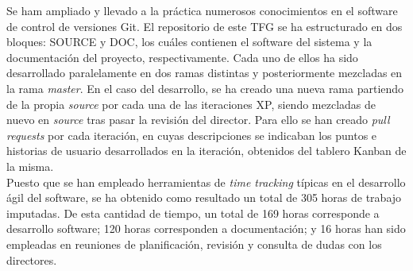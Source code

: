 Se ham ampliado y llevado a la práctica numerosos conocimientos en el software de control de versiones Git. El repositorio de este \gls{TFG} se ha estructurado en dos bloques: SOURCE y DOC, los cuáles contienen el software del sistema y la documentación del proyecto, respectivamente. Cada uno de ellos ha sido desarrollado paralelamente en dos ramas distintas y posteriormente mezcladas en la rama \textit{master}. En el caso del desarrollo, se ha creado una nueva rama partiendo de la propia \textit{source} por cada una de las iteraciones \gls{XP}, siendo mezcladas de nuevo en \textit{source} tras pasar la revisión del director. Para ello se han creado \textit{pull requests} por cada iteración, en cuyas descripciones se indicaban los puntos e historias de usuario desarrollados en la iteración, obtenidos del tablero Kanban de la misma.\\

Puesto que se han empleado herramientas de \textit{time tracking} típicas en el desarrollo ágil del software, se ha obtenido como resultado un total de 305 horas de trabajo imputadas. De esta cantidad de tiempo, un total de 169 horas corresponde a desarrollo software; 120 horas corresponden a documentación; y 16 horas han sido empleadas en reuniones de planificación, revisión y consulta de dudas con los directores.
